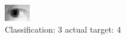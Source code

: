 \begin{figure}[h!]
\begin{center}
\includegraphics[width=0.60\columnwidth]{figures/ID1213_class_3_target_4.png}
\end{center}
\caption{ Classification: 3 actual target: 4}
\label{fig:ID1213_class_3_target_4}
\end{figure}
